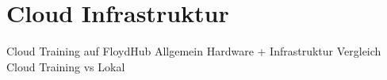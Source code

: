 \section{Cloud Infrastruktur}

Cloud Training auf FloydHub
Allgemein Hardware + Infrastruktur
Vergleich Cloud Training vs Lokal